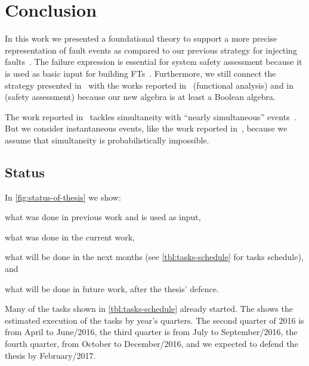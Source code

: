 \documentclass[12pt,openright,twoside,a4paper,oldfontcommands,english,brazil,final]{abntex2}
\theoremstyle{theo}
\newcommand{\simulink}{Simulink\xspace}
\begin{document}
\chapter{Conclusion}
\label{sec:conclusion}

In this work we presented a foundational theory to support a more precise representation of fault events as compared to our previous strategy for injecting faults~\cite{DM2012}.
%
The failure expression is essential for system safety assessment because it is used as basic input for building \aclp{FT}~\cite{PMS+2001,JMS+2011,GMS+2010}.
%
%
Furthermore, we still connect the strategy presented in~\cite{MJG+2010} with the works reported in~\cite{JMS+2011} (functional analysis) and in~\cite{GMS+2010,PMS+2001} (safety assessment) because our new algebra is at least a Boolean algebra.

\begin{sloppypar}
The work reported in~\cite{Walker2009,WP2009,WP2010} tackles simultaneity with ``nearly simultaneous'' events~\cite{EWG2013}.
But we consider instantaneous events, like the work reported in~\cite{MRL2014}, because we assume that simultaneity is probabilistically impossible.
\end{sloppypar}

\section{Status}

In \cref{fig:status-of-thesis} we show:
\begin{alineasinline}
  \item what was done in previous work and is used as input,
  \item what was done in the current work,
  \item what will be done in the next months (see \cref{tbl:tasks-schedule} for tasks schedule), and
  \item what will be done in future work, after the thesis' defence.
\end{alineasinline}
Many of the tasks shown in \cref{tbl:tasks-schedule} already started.
The  shows the estimated execution of the tasks by year's quarters.
The second quarter of 2016 is from April to June/2016, the third quarter is from July to September/2016, the fourth quarter, from October to December/2016, and we expected to defend the thesis by February/2017.
\end{document}
